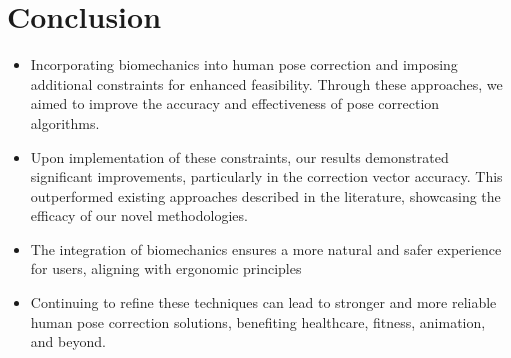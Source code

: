 \section{Conclusion}
\begin{itemize}
\item Incorporating biomechanics into human pose correction and imposing additional constraints for enhanced feasibility. Through these approaches, we aimed to improve the accuracy and effectiveness of pose correction algorithms.
\item Upon implementation of these constraints, our results demonstrated significant improvements, particularly in the correction vector accuracy. This outperformed existing approaches described in the literature, showcasing the efficacy of our novel methodologies.
\item The integration of biomechanics ensures a more natural and safer experience for users, aligning with ergonomic principles 
\item Continuing to refine these techniques can lead to stronger and more reliable human pose correction solutions, benefiting healthcare, fitness, animation, and beyond.
  \end{itemize}
\newpage
